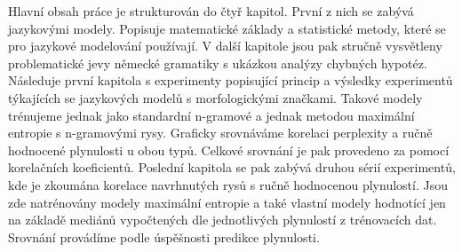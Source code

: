 \documentclass[12pt,a4paper]{report}
\begin{document}
Hlavní obsah práce je strukturován do čtyř kapitol. První z nich se zabývá jazykovými modely. Popisuje matematické základy a statistické metody, které se pro jazykové modelování používají. V další kapitole jsou pak stručně vysvětleny problematické jevy německé gramatiky s ukázkou analýzy chybných hypotéz. Následuje první kapitola s experimenty popisující princip a výsledky experimentů týkajících se jazykových modelů s morfologickými značkami. Takové modely trénujeme jednak jako standardní n-gramové a jednak metodou maximální entropie s n-gramovými rysy. Graficky srovnáváme korelaci perplexity a ručně hodnocené plynulosti u obou typů. Celkové srovnání je pak provedeno za pomocí korelačních koeficientů. Poslední kapitola se pak zabývá druhou sérií experimentů, kde je zkoumána korelace navrhnutých rysů s ručně hodnocenou plynulostí. Jsou zde natrénovány modely maximální entropie a také vlastní modely hodnotící jen na základě mediánů vypočtených dle jednotlivých plynulostí z trénovacích dat. Srovnání provádíme podle úspěšnosti predikce plynulosti.










\end{document}
